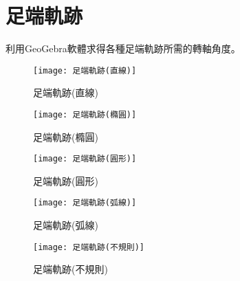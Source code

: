 \section*{足端軌跡}
利用GeoGebra軟體求得各種足端軌跡所需的轉軸角度。\

\begin{figure}[htbp]
  \centering
  \begin{minipage}{0.5\linewidth}
    \centering
    \texttt{[image: 足端軌跡(直線)]}
    \caption{足端軌跡(直線)}
    \label{足端軌跡(直線)}
  \end{minipage}
  \hfill
  \begin{minipage}{0.5\linewidth}
    \centering
    \texttt{[image: 足端軌跡(橢圓)]}
    \caption{足端軌跡(橢圓)}
    \label{足端軌跡(橢圓)}
  \end{minipage}
  
  \vspace{0.5cm} %
  
  \begin{minipage}{0.5\linewidth}
    \centering
    \texttt{[image: 足端軌跡(圓形)]}
    \caption{足端軌跡(圓形)}
    \label{足端軌跡(圓形)}
  \end{minipage}
  \hfill
  \begin{minipage}{0.5\textwidth}
    \centering
    \texttt{[image: 足端軌跡(弧線)]}
    \caption{足端軌跡(弧線)}
    \label{足端軌跡(弧線)}
  \end{minipage}
  
  \vspace{0.5cm} %
  
  \begin{minipage}{0.5\linewidth}
    \centering
    \texttt{[image: 足端軌跡(不規則)]}
    \caption{足端軌跡(不規則)}
    \label{足端軌跡(不規則)}
  \end{minipage}
\end{figure}
  
\newpage
